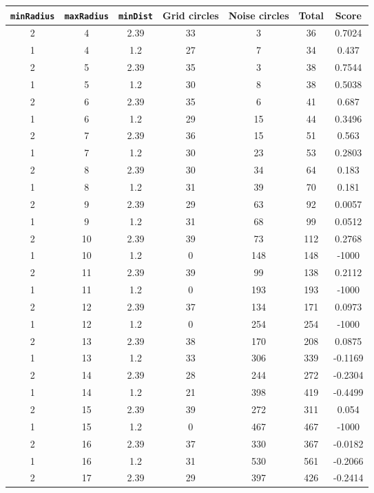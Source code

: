 \documentclass[letterpaper, 12pt]{article}
\begin{document}
\begin{longtable}{|c|c|c|c|c|c|c|}
\hline
\textbf{\texttt{minRadius}} & \textbf{\texttt{maxRadius}} & \textbf{\texttt{minDist}} & \textbf{Grid circles} & \textbf{Noise circles} & \textbf{Total} & \textbf{Score} \\
\hline
2 & 4 & 2.39 & 33 & 3 & 36 & 0.7024 \\
\hline
1 & 4 & 1.2 & 27 & 7 & 34 & 0.437 \\
\hline
2 & 5 & 2.39 & 35 & 3 & 38 & 0.7544 \\
\hline
1 & 5 & 1.2 & 30 & 8 & 38 & 0.5038 \\
\hline
2 & 6 & 2.39 & 35 & 6 & 41 & 0.687 \\
\hline
1 & 6 & 1.2 & 29 & 15 & 44 & 0.3496 \\
\hline
2 & 7 & 2.39 & 36 & 15 & 51 & 0.563 \\
\hline
1 & 7 & 1.2 & 30 & 23 & 53 & 0.2803 \\
\hline
2 & 8 & 2.39 & 30 & 34 & 64 & 0.183 \\
\hline
1 & 8 & 1.2 & 31 & 39 & 70 & 0.181 \\
\hline
2 & 9 & 2.39 & 29 & 63 & 92 & 0.0057 \\
\hline
1 & 9 & 1.2 & 31 & 68 & 99 & 0.0512 \\
\hline
2 & 10 & 2.39 & 39 & 73 & 112 & 0.2768 \\
\hline
1 & 10 & 1.2 & 0 & 148 & 148 & -1000 \\
\hline
2 & 11 & 2.39 & 39 & 99 & 138 & 0.2112 \\
\hline
1 & 11 & 1.2 & 0 & 193 & 193 & -1000 \\
\hline
2 & 12 & 2.39 & 37 & 134 & 171 & 0.0973 \\
\hline
1 & 12 & 1.2 & 0 & 254 & 254 & -1000 \\
\hline
2 & 13 & 2.39 & 38 & 170 & 208 & 0.0875 \\
\hline
1 & 13 & 1.2 & 33 & 306 & 339 & -0.1169 \\
\hline
2 & 14 & 2.39 & 28 & 244 & 272 & -0.2304 \\
\hline
1 & 14 & 1.2 & 21 & 398 & 419 & -0.4499 \\
\hline
2 & 15 & 2.39 & 39 & 272 & 311 & 0.054 \\
\hline
1 & 15 & 1.2 & 0 & 467 & 467 & -1000 \\
\hline
2 & 16 & 2.39 & 37 & 330 & 367 & -0.0182 \\
\hline
1 & 16 & 1.2 & 31 & 530 & 561 & -0.2066 \\
\hline
2 & 17 & 2.39 & 29 & 397 & 426 & -0.2414 \\

\end{longtable}
\end{document}
